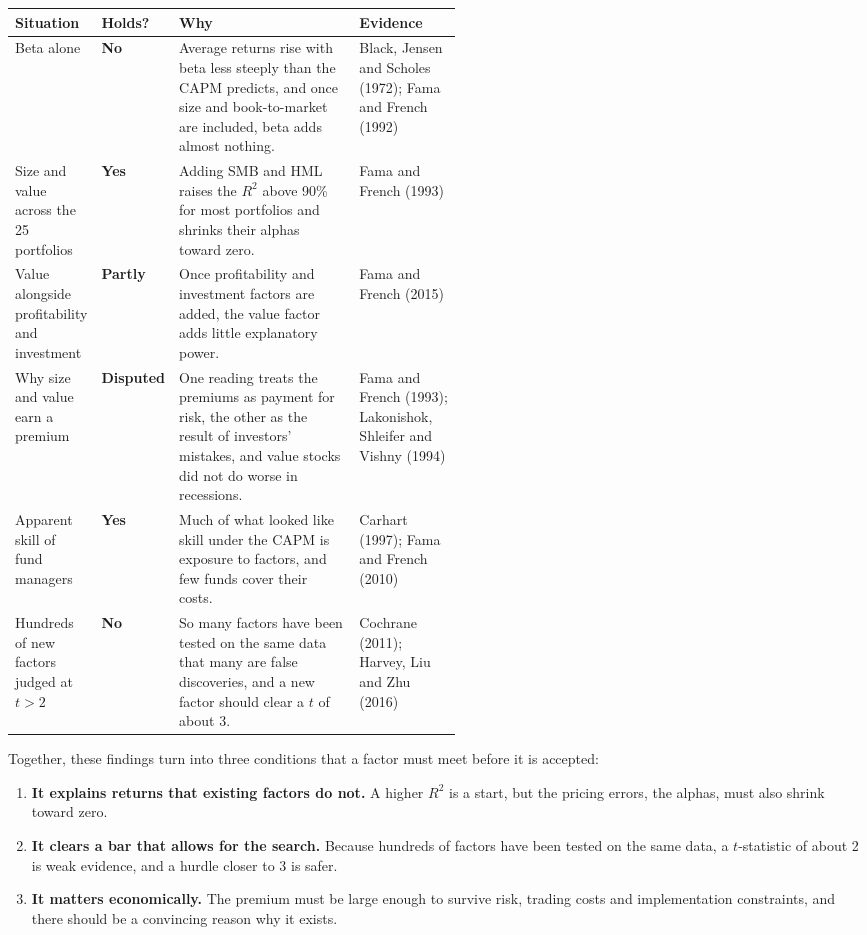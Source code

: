 \begin{center}
\small
\begin{tabularx}{\linewidth}{@{}>{\raggedright\arraybackslash}p{0.19\linewidth}>{\raggedright\arraybackslash}p{0.10\linewidth}>{\raggedright\arraybackslash}X>{\raggedright\arraybackslash}p{0.23\linewidth}@{}}
\toprule
Situation & Holds? & Why & Evidence \\
\midrule
Beta alone & \textbf{No} & Average returns rise with beta less steeply than the CAPM predicts, and once size and book-to-market are included, beta adds almost nothing. & Black, Jensen and Scholes (1972); Fama and French (1992) \\
\addlinespace[3pt]
Size and value across the 25 portfolios & \textbf{Yes} & Adding SMB and HML raises the $R^2$ above 90\% for most portfolios and shrinks their alphas toward zero. & Fama and French (1993) \\
\addlinespace[3pt]
Value alongside profitability and investment & \textbf{Partly} & Once profitability and investment factors are added, the value factor adds little explanatory power. & Fama and French (2015) \\
\addlinespace[3pt]
Why size and value earn a premium & \textbf{Disputed} & One reading treats the premiums as payment for risk, the other as the result of investors' mistakes, and value stocks did not do worse in recessions. & Fama and French (1993); Lakonishok, Shleifer and Vishny (1994) \\
\addlinespace[3pt]
Apparent skill of fund managers & \textbf{Yes} & Much of what looked like skill under the CAPM is exposure to factors, and few funds cover their costs. & Carhart (1997); Fama and French (2010) \\
\addlinespace[3pt]
Hundreds of new factors judged at $t > 2$ & \textbf{No} & So many factors have been tested on the same data that many are false discoveries, and a new factor should clear a $t$ of about 3. & Cochrane (2011); Harvey, Liu and Zhu (2016) \\
\bottomrule
\end{tabularx}
\end{center}

Together, these findings turn into three conditions that a factor must meet before it is accepted:

\begin{enumerate}
  \item \textbf{It explains returns that existing factors do not.} A higher $R^2$ is a start, but the pricing errors, the alphas, must also shrink toward zero.
  \item \textbf{It clears a bar that allows for the search.} Because hundreds of factors have been tested on the same data, a $t$-statistic of about 2 is weak evidence, and a hurdle closer to 3 is safer.
  \item \textbf{It matters economically.} The premium must be large enough to survive risk, trading costs and implementation constraints, and there should be a convincing reason why it exists.
\end{enumerate}

